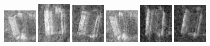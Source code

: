 \begin{figure}
    \includegraphics[width=0.15\textwidth]{chapters/images/dataset/all-class-images/can/can-260.jpg}
    \includegraphics[width=0.15\textwidth]{chapters/images/dataset/all-class-images/can/can-95.jpg}
    \includegraphics[width=0.15\textwidth]{chapters/images/dataset/all-class-images/can/can-136.jpg}
    \includegraphics[width=0.15\textwidth]{chapters/images/dataset/all-class-images/can/can-263.jpg}
    \includegraphics[width=0.15\textwidth]{chapters/images/dataset/all-class-images/can/can-167.jpg}
    \includegraphics[width=0.15\textwidth]{chapters/images/dataset/all-class-images/can/can-148.jpg}
    

\end{figure}
